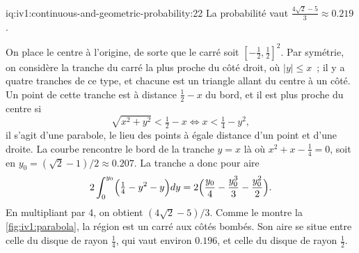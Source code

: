 \begin{solution}{iq:iv1:continuous-and-geometric-probability:22}
La probabilité vaut $\frac{4\sqrt{2} - 5}{3} \approx 0.219$.

On place le centre à l'origine, de sorte que le carré soit $[-\tfrac12, \tfrac12]^2$. Par symétrie, on considère la tranche du carré la plus proche du côté droit, où $|y| \le x$~; il y a quatre tranches de ce type, et chacune est un triangle allant du centre à un côté. Un point de cette tranche est à distance $\tfrac12 - x$ du bord, et il est plus proche du centre si
\[
\sqrt{x^2 + y^2} < \tfrac12 - x \iff x < \tfrac14 - y^2,
\]
il s'agit d'une parabole, le lieu des points à égale distance d'un point et d'une droite. La courbe rencontre le bord de la tranche $y = x$ là où $x^2 + x - \tfrac14 = 0$, soit en $y_0 = (\sqrt{2} - 1)/2 \approx 0.207$. La tranche a donc pour aire
\[
2\int_0^{y_0} \Bigl(\tfrac14 - y^2 - y\Bigr) dy = 2\Bigl(\frac{y_0}{4} - \frac{y_0^3}{3} - \frac{y_0^2}{2}\Bigr).
\]
En multipliant par 4, on obtient $(4\sqrt{2} - 5)/3$. Comme le montre la \cref{fig:iv1:parabola}, la région est un carré aux côtés bombés. Son aire se situe entre celle du disque de rayon $\tfrac14$, qui vaut environ $0.196$, et celle du disque de rayon $\tfrac12$.

\begin{omfigure}

\label{fig:iv1:parabola}
\end{omfigure}

\end{solution}

